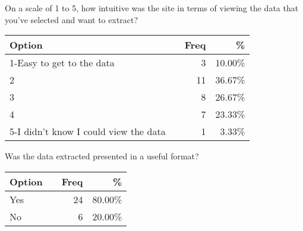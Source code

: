 \begin{center}
On a scale of 1 to 5, how intuitive was the site in terms of viewing the data that you've selected and want to extract?\\
\begin{tabular}{|l|c|r|r|}
\hline
Option	& & Freq & \% \\
\hline
\hline
1-Easy to get to the data	&	&3	&10.00\%\\
2	&	&11	&36.67\%\\
3	&	&8	&26.67\%\\
4	&	&7	&23.33\%\\
5-I didn't know I could view the data	&	&1	&3.33\%\\
\hline
\end{tabular}


Was the data extracted presented in a useful format?\\
\begin{tabular}{|l|c|r|r|}
\hline
Option	& & Freq & \% \\
\hline
\hline
Yes	&	& 24	&80.00\%\\
No	&	& 6	& 20.00\%\\
\hline
\end{tabular}
\end{center}
